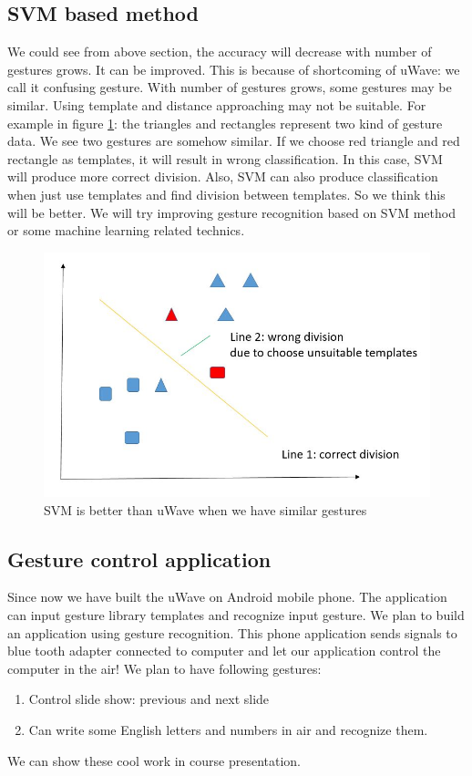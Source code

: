 \documentclass{acm_proc_article-sp}
\begin{document}
\subsection{SVM based method}
We could see from above section, the accuracy will decrease with number of gestures grows. It can be improved. This is because of shortcoming of uWave: we call it confusing gesture. With number of gestures grows, some gestures may be similar. Using template and distance approaching may not be suitable. For example in figure \ref{SVMuWave}: the triangles and rectangles represent two kind of gesture data. We see two gestures are somehow similar. If we choose red triangle and red rectangle as templates, it will result in wrong classification. In this case, SVM will produce more correct division. Also, SVM can also produce classification when just use templates and find division between templates. So we think this will be better. We will try improving gesture recognition based on SVM method or some machine learning related technics.
\begin{figure}
  \includegraphics[width=0.8\linewidth]{SVM_better_than_uWave.JPG}
  \caption{SVM is better than uWave when we have similar gestures}
  \label{SVMuWave}
\end{figure} 
\subsection{Gesture control application}
Since now we have built the uWave on Android mobile phone. The application can input gesture library templates and recognize input gesture. We plan to build an application using gesture recognition. This phone application sends signals to blue tooth adapter connected to computer and let our application control the computer in the air! We plan to have following gestures:
\begin{enumerate}
  \item Control slide show: previous and next slide 
  \item Can write some English letters and numbers in air and recognize them. 
\end{enumerate}
We can show these cool work in course presentation.
\end{document}
